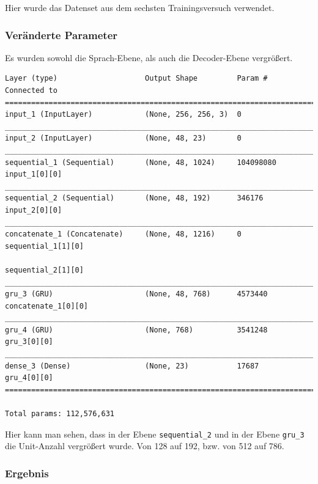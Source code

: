 \documentclass[pdftex,a4paper,halfparskip, article]{scrartcl}
\begin{document}
Hier wurde das Datenset aus dem sechsten Trainingsversuch verwendet.


\subsubsection*{Veränderte Parameter}

Es wurden sowohl die Sprach-Ebene, als auch die Decoder-Ebene vergrößert.

\begin{verbatim}
Layer (type)                    Output Shape         Param #     Connected to
=============================================================================
input_1 (InputLayer)            (None, 256, 256, 3)  0
_____________________________________________________________________________
input_2 (InputLayer)            (None, 48, 23)       0
_____________________________________________________________________________
sequential_1 (Sequential)       (None, 48, 1024)     104098080   input_1[0][0]
_____________________________________________________________________________
sequential_2 (Sequential)       (None, 48, 192)      346176      input_2[0][0]
_____________________________________________________________________________
concatenate_1 (Concatenate)     (None, 48, 1216)     0           sequential_1[1][0]
                                                                 sequential_2[1][0]
_____________________________________________________________________________
gru_3 (GRU)                     (None, 48, 768)      4573440     concatenate_1[0][0]
_____________________________________________________________________________
gru_4 (GRU)                     (None, 768)          3541248     gru_3[0][0]
_____________________________________________________________________________
dense_3 (Dense)                 (None, 23)           17687       gru_4[0][0]
=============================================================================

Total params: 112,576,631

\end{verbatim}

Hier kann man sehen, dass in der Ebene \texttt{sequential\_2} und in der Ebene \texttt{gru\_3} die Unit-Anzahl vergrößert wurde. Von 128 auf 192, bzw. von 512 auf 786.

\subsubsection*{Ergebnis}
\end{document}
